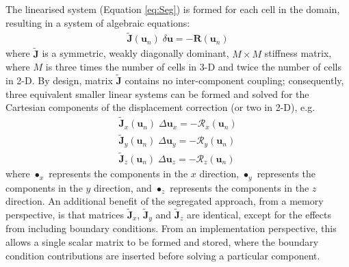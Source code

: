 \documentclass[sn-mathphys,Numbered,draft]{sn-jnl}%
\newcommand{\bb}{\boldsymbol}
\begin{document}
The linearised system (Equation \ref{eq:Seg}) is formed for each cell in the domain, resulting in a system of algebraic equations:
\begin{eqnarray} \label{eq:SegSys}
    \bb{\tilde{J}}(\bb{u}_n) \; \delta \bb{u} = - \bb{R}(\bb{u}_n)
\end{eqnarray}
where $\bb{\tilde{J}}$ is a symmetric, weakly diagonally dominant, $M \times M$ stiffness matrix, where $M$ is three times the number of cells in 3-D and twice the number of cells in 2-D.
By design, matrix $\bb{\tilde{J}}$  contains no inter-component coupling; consequently, three equivalent smaller linear systems can be formed and solved for the Cartesian components of the displacement correction (or two in 2-D), e.g.
\begin{eqnarray} \label{eq:SegSysX}
     \bb{\tilde{J}}_x(\bb{u}_n)  \;  \Delta \bb{u}_x = - \mathcal{R}_x(\bb{u}_n) \label{eq:segX} \\
     \bb{\tilde{J}}_y(\bb{u}_n)  \;  \Delta \bb{u}_y = - \mathcal{R}_y(\bb{u}_n) \label{eq:segY} \\
     \bb{\tilde{J}}_z(\bb{u}_n)  \;  \Delta \bb{u}_z = - \mathcal{R}_z(\bb{u}_n) \label{eq:segZ}
\end{eqnarray}
where $ \bullet_x$ represents the components in the $x$ direction, $ \bullet_y$ represents the components in the $y$ direction, and $ \bullet_z$ represents the components in the $z$ direction.
An additional benefit of the segregated approach, from a memory perspective, is that matrices $ \bb{\tilde{J}}_x$, $ \bb{\tilde{J}}_y$ and $\bb{\tilde{J}}_z$ are identical, except for the effects from including boundary conditions.
From an implementation perspective, this allows a single scalar matrix to be formed and stored, where the boundary condition contributions are inserted before solving a particular component.
\end{document}
